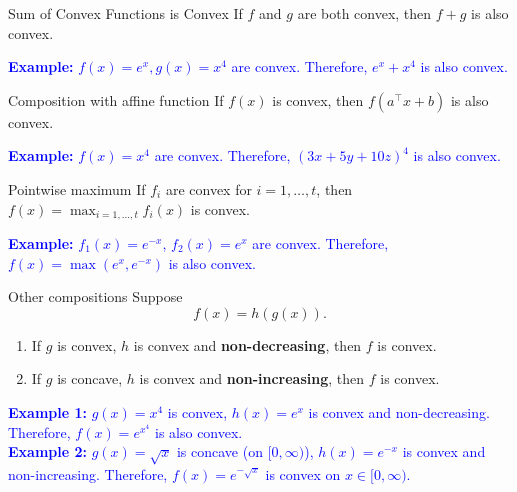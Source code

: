 \begin{general}{Sum of Convex Functions is Convex}{}
If $f$ and $g$ are both convex, then $f+g$ is also convex.

\textcolor{blue}{\textbf{Example: } $f(x) = e^x, g(x) = x^4$ are convex.  Therefore, $e^x + x^4$ is also convex.}
\end{general}

\begin{general}{Composition with affine function}{}
If $f(x)$ is convex, then $f(a^\top x + b)$ is also convex.

\textcolor{blue}{\textbf{Example: } $f(x) = x^4$ are convex.  Therefore, $(3x + 5y + 10z)^4$ is also convex.}
\end{general}

\begin{general}{Pointwise maximum}{}
If $f_i$ are convex for $i=1, \dots, t$, then $f(x) = \max_{i=1, \dots, t} f_i(x)$ is convex.

\textcolor{blue}{\textbf{Example: } $f_1(x) = e^{-x}$, $f_2(x) = e^{x}$ are convex.  Therefore, $f(x) = \max(e^x, e^{-x})$ is also convex.}
\end{general}

\begin{general}{Other compositions}{}
Suppose 
$$
f(x) = h(g(x)).
$$
\begin{enumerate}
\item If $g$ is convex, $h$ is convex and \textbf{non-decreasing}, then $f$ is convex.
\item If $g$ is concave, $h$ is convex and \textbf{non-increasing}, then $f$ is convex.
\end{enumerate}

\textcolor{blue}{\textbf{Example 1: } $g(x) = x^4$ is convex, $h(x) = e^{x}$ is convex and non-decreasing.  Therefore, $f(x) = e^{x^4}$ is also convex.}\\

\textcolor{blue}{\textbf{Example 2: } $g(x) = \sqrt{x}$ is concave (on $[0,\infty)$), $h(x) = e^{-x}$ is convex and non-increasing.  Therefore, $f(x) = e^{-\sqrt{x}}$ is convex on $x \in [0,\infty)$.}
\end{general}
